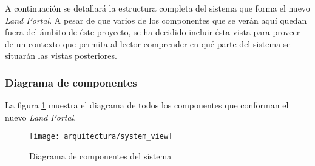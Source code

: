 A continuación se detallará la estructura completa del sistema que forma el nuevo \textit{Land Portal}.  A pesar de que varios de los componentes que se verán aquí quedan fuera del ámbito de éste proyecto, se ha decidido incluir ésta vista para proveer de un contexto que permita al lector comprender en qué parte del sistema se situarán las vistas posteriores.

\subsubsection{Diagrama de componentes}
La figura \ref{fig:diagrama_componentes_sistema} muestra el diagrama de todos los componentes que conforman el nuevo \textit{Land Portal}.
\begin{landscape}
	\begin{figure}[ht]
		\centering
		\texttt{[image: arquitectura/system\_view]}
		\caption{Diagrama de componentes del sistema}
		\label{fig:diagrama_componentes_sistema}
	\end{figure}
\end{landscape}


